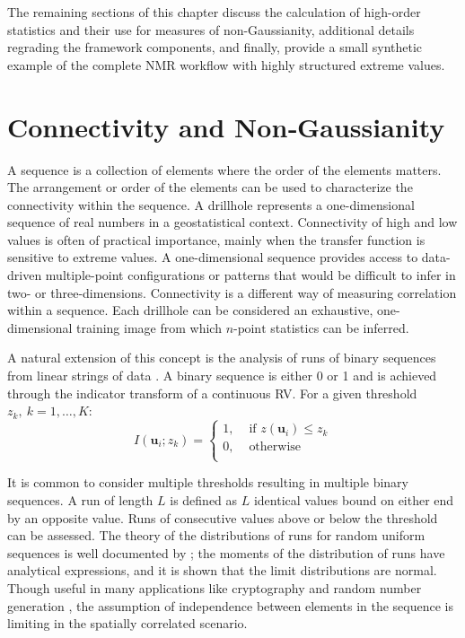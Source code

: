 The remaining sections of this chapter discuss the calculation of high-order statistics and their use for measures of non-Gaussianity, additional details regrading the framework components, and finally, provide a small synthetic example of the complete \gls{NMR} workflow with highly structured extreme values.


\FloatBarrier
\section{Connectivity and Non‐Gaussianity}
\label{sec:03connect}

A sequence is a collection of elements where the order of the elements matters. The arrangement or order of the elements can be used to characterize the connectivity within the sequence. A drillhole represents a one-dimensional sequence of real numbers in a geostatistical context. Connectivity of high and low values is often of practical importance, mainly when the transfer function is sensitive to extreme values. A one-dimensional sequence provides access to data-driven multiple-point configurations or patterns that would be difficult to infer in two- or three-dimensions. Connectivity is a different way of measuring correlation within a sequence. Each drillhole can be considered an exhaustive, one-dimensional training image from which $n\text{-point}$ statistics can be inferred.

A natural extension of this concept is the analysis of runs of binary sequences from linear strings of data \citep{ortiz2003characterization}. A binary sequence is either 0 or 1 and is achieved through the indicator transform of a continuous \gls{RV}. For a given threshold $z_{k}, \ k=1,\dots,K$:
\begin{equation}
    I(\mathbf{u}_{i};z_{k}) =
    \begin{cases}
        1, & \text{ if }z(\mathbf{u}_{i}) \leq z_{k} \\
        0, & \text{ otherwise }                      \\
    \end{cases}
    \label{eq:indicator}
\end{equation}

It is common to consider multiple thresholds resulting in multiple binary sequences. A run of length $L$ is defined as $L$ identical values bound on either end by an opposite value. Runs of consecutive values above or below the threshold can be assessed. The theory of the distributions of runs for random uniform sequences is well documented by \cite{fu2003distribution}; the moments of the distribution of runs have analytical expressions, and it is shown that the limit distributions are normal. Though useful in many applications like cryptography and random number generation \citep{rukhin2010statistical}, the assumption of independence between elements in the sequence is limiting in the spatially correlated scenario.

